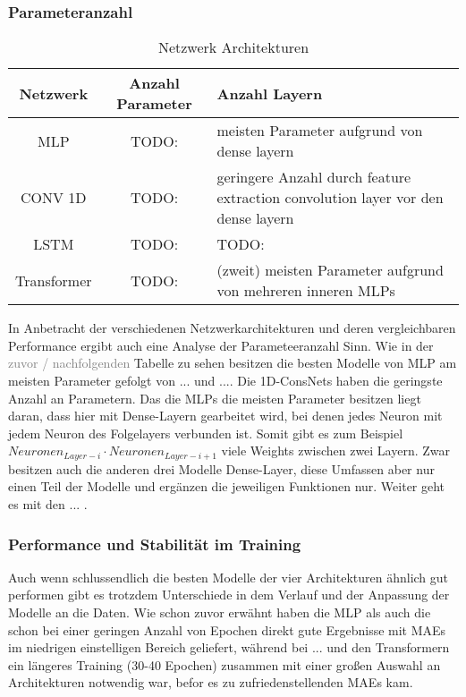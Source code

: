 \documentclass[manuscript,screen,review]{acmart} %
\begin{document}
\subsubsection{Parameteranzahl}
\begin{table}
  \caption{Netzwerk Architekturen}
  \label{tab:freq}
  \begin{tabular}{ccl}
    \toprule
    Netzwerk&Anzahl Parameter&Anzahl Layern\\
    \midrule
    MLP & TODO: & meisten Parameter aufgrund von dense layern\\
    CONV 1D & TODO: & geringere Anzahl durch feature extraction convolution layer vor den dense layern\\
    LSTM & TODO: & TODO:\\
    Transformer & TODO: & (zweit) meisten Parameter aufgrund von mehreren inneren MLPs\\
  \bottomrule
\end{tabular}
\end{table}

In Anbetracht der verschiedenen Netzwerkarchitekturen und deren vergleichbaren Performance ergibt auch eine Analyse der Parameteeranzahl Sinn.
Wie in der \textcolor{gray}{zuvor / nachfolgenden} Tabelle zu sehen besitzen die besten Modelle von MLP am meisten Parameter gefolgt von ... und .... Die 1D-ConsNets haben die geringste Anzahl an Parametern. 
Das die MLPs die meisten Parameter besitzen liegt daran, dass hier mit Dense-Layern gearbeitet wird, bei denen jedes Neuron mit jedem Neuron des Folgelayers verbunden ist. Somit gibt es zum Beispiel $Neuronen_{Layer-i} \cdot Neuronen_{Layer-i+1}$ viele Weights zwischen zwei Layern. Zwar besitzen auch die anderen drei Modelle Dense-Layer, diese Umfassen aber nur einen Teil der Modelle und ergänzen die jeweiligen Funktionen nur.
Weiter geht es mit den ... .

\subsubsection{Performance und Stabilität im Training}
Auch wenn schlussendlich die besten Modelle der vier Architekturen ähnlich gut performen gibt es trotzdem Unterschiede in dem Verlauf und der Anpassung der Modelle an die Daten. Wie schon zuvor erwähnt haben die MLP als auch die  schon bei einer geringen Anzahl von Epochen direkt gute Ergebnisse mit MAEs im niedrigen einstelligen Bereich geliefert, während bei ... und den Transformern ein längeres Training (30-40 Epochen) zusammen mit einer großen Auswahl an Architekturen notwendig war, befor es zu zufriedenstellenden MAEs kam.
\end{document}
